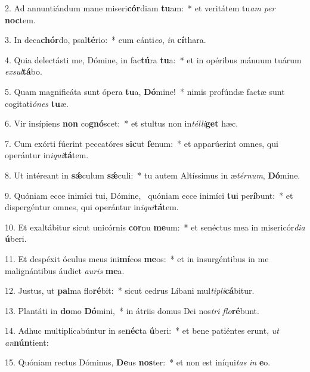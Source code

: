 2. Ad annuntiándum mane miseri\textbf{cór}diam \textbf{tu}am:~*  et veritátem tu\textit{am} \textit{per} \textbf{noc}tem.\

3. In deca\textbf{chór}do, psal\textbf{té}rio:~*  cum cánti\textit{co}, \textit{in} \textbf{cí}thara.\

4. Quia delectásti me, Dómine, in fac\textbf{tú}ra \textbf{tu}a:~*  et in opéribus mánuum tuárum \textit{ex}\textit{sul}\textbf{tá}bo.\

5. Quam magnificáta sunt ópera \textbf{tu}a, \textbf{Dó}mine!~*  nimis profúndæ factæ sunt cogitati\textit{ó}\textit{nes} \textbf{tu}æ.\

6. Vir insípiens \textbf{non} co\textbf{gnó}scet:~*  et stultus non in\textit{tél}\textit{li}\textbf{get} hæc.\

7. Cum exórti fúerint peccatóres \textbf{sic}ut \textbf{fe}num:~*  et apparúerint omnes, qui operántur in\textit{i}\textit{qui}\textbf{tá}tem.\

8. Ut intéreant in \textbf{sǽ}culum \textbf{sǽ}culi:~*  tu autem Altíssimus in æ\textit{tér}\textit{num}, \textbf{Dó}mine.\

9. Quóniam ecce inimíci tui, Dómine, \dag\  quóniam ecce inimíci \textbf{tu}i per\textbf{í}bunt:~*  et dispergéntur omnes, qui operántur in\textit{i}\textit{qui}\textbf{tá}tem.\

10. Et exaltábitur sicut unicórnis \textbf{cor}nu \textbf{me}um:~*  et senéctus mea in misericór\textit{di}\textit{a} \textbf{ú}beri.\

11. Et despéxit óculus meus ini\textbf{mí}cos \textbf{me}os:~*  et in insurgéntibus in me malignántibus áudiet \textit{au}\textit{ris} \textbf{me}a.\

12. Justus, ut \textbf{pal}ma flo\textbf{ré}bit:~*  sicut cedrus Líbani mul\textit{ti}\textit{pli}\textbf{cá}bitur.\

13. Plantáti in \textbf{do}mo \textbf{Dó}mini,~*  in átriis domus Dei nos\textit{tri} \textit{flo}\textbf{ré}bunt.\

14. Adhuc multiplicabúntur in se\textbf{néc}ta \textbf{ú}beri:~*  et bene patiéntes erunt, \textit{ut} \textit{an}\textbf{nún}tient:\

15. Quóniam rectus Dóminus, \textbf{De}us \textbf{nos}ter:~*  et non est iníqui\textit{tas} \textit{in} \textbf{e}o.\

